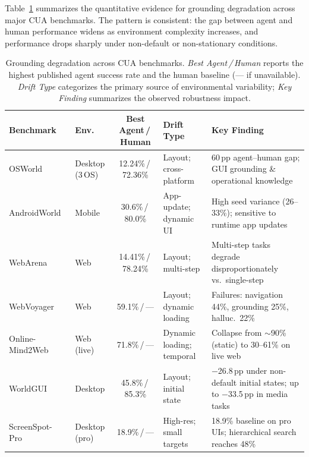 Table~\ref{tab:grounding-degradation} summarizes the quantitative evidence for grounding degradation across major CUA benchmarks. The pattern is consistent: the gap between agent and human performance widens as environment complexity increases, and performance drops sharply under non-default or non-stationary conditions.

\begin{table}[!ht]
\caption{Grounding degradation across CUA benchmarks. \emph{Best Agent\,/\,Human} reports the highest published agent success rate and the human baseline (--- if unavailable). \emph{Drift Type} categorizes the primary source of environmental variability; \emph{Key Finding} summarizes the observed robustness impact.}
\label{tab:grounding-degradation}
\centering
\footnotesize
\setlength{\tabcolsep}{4pt}
\begin{tabular}{p{2.4cm} p{1.3cm} c p{1.8cm} p{3.8cm}}
\toprule
\textbf{Benchmark} & \textbf{Env.} & \textbf{Best Agent\,/\,Human} & \textbf{Drift Type} & \textbf{Key Finding} \\
\midrule
OSWorld~\cite{osworld2024}
  & Desktop (3\,OS)
  & 12.24\%\,/\,72.36\%
  & Layout; cross-platform
  & 60\,pp agent--human gap; GUI grounding \& operational knowledge \\
\midrule
AndroidWorld~\cite{androidworld2024}
  & Mobile
  & 30.6\%\,/\,80.0\%
  & App-update; dynamic UI
  & High seed variance (26--33\%); sensitive to runtime app updates \\
\midrule
WebArena~\cite{webarena2023}
  & Web
  & 14.41\%\,/\,78.24\%
  & Layout; multi-step
  & Multi-step tasks degrade disproportionately vs.\ single-step \\
\midrule
WebVoyager~\cite{webvoyager2024}
  & Web
  & 59.1\%\,/\,---
  & Layout; dynamic loading
  & Failures: navigation 44\%, grounding 25\%, halluc.\ 22\% \\
\midrule
Online-Mind2Web~\cite{onlinemind2web2025}
  & Web (live)
  & 71.8\%\,/\,---
  & Dynamic loading; temporal
  & Collapse from ${\sim}$90\% (static) to 30--61\% on live web \\
\midrule
WorldGUI~\cite{worldgui2025}
  & Desktop
  & 45.8\%\,/\,85.3\%
  & Layout; initial state
  & $-$26.8\,pp under non-default initial states; up to $-$33.5\,pp in media tasks \\
\midrule
ScreenSpot-Pro~\cite{screenspotpro2025}
  & Desktop (pro)
  & 18.9\%\,/\,---
  & High-res; small targets
  & 18.9\% baseline on pro UIs; hierarchical search reaches 48\% \\
\bottomrule
\end{tabular}
\end{table}

